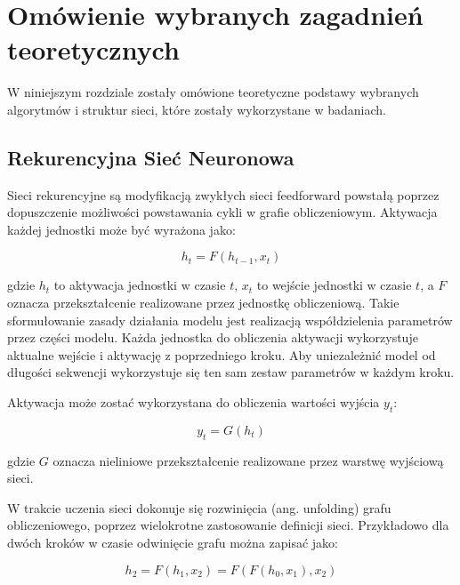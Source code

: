\documentclass[oneside, mag]{mgr}
\begin{document}
\chapter{Omówienie wybranych zagadnień teoretycznych}

W niniejszym rozdziale zostały omówione teoretyczne podstawy wybranych algorytmów i struktur sieci, które zostały wykorzystane w badaniach.

\section{Rekurencyjna Sieć Neuronowa}

Sieci rekurencyjne są modyfikacją zwykłych sieci feedforward powstałą poprzez dopuszczenie możliwości powstawania cykli w grafie obliczeniowym. Aktywacja każdej jednostki może być wyrażona jako:


\begin{equation}
	h_t = F(h_{t-1}, x_t)
	\label{eq:basic-rnn}
\end{equation}

gdzie $h_t$ to aktywacja jednostki w czasie $t$, $x_t$ to wejście jednostki w czasie $t$, a $F$ oznacza przekształcenie realizowane przez jednostkę obliczeniową. Takie sformułowanie zasady działania modelu jest realizacją współdzielenia parametrów przez części modelu. Każda jednostka do obliczenia aktywacji wykorzystuje aktualne wejście i aktywację z poprzedniego kroku. Aby uniezależnić model od długości sekwencji wykorzystuje się ten sam zestaw parametrów w każdym kroku.

Aktywacja może zostać wykorzystana do obliczenia wartości wyjścia $y_t$:

\begin{equation}
	y_t = G(h_t)
\end{equation}

gdzie $G$ oznacza nieliniowe przekształcenie realizowane przez warstwę wyjściową sieci.

W trakcie uczenia sieci dokonuje się rozwinięcia (ang. unfolding) grafu obliczeniowego, poprzez wielokrotne zastosowanie definicji sieci. Przykładowo dla dwóch kroków w czasie odwinięcie grafu można zapisać jako:

\begin{equation}
	h_2 = F(h_1, x_2) = F(F(h_0, x_1), x_2)
\end{equation}
\end{document}
